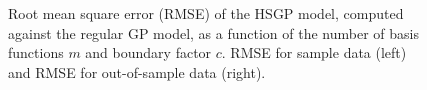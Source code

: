 \documentclass[onecolumn,a4paper,11pt]{article}
\begin{document}
\begin{figure}
\caption{Root mean square error (RMSE) of the HSGP model, computed against the regular GP model, as a function of the number of basis functions $m$ and boundary factor $c$. RMSE for sample data (left) and RMSE for out-of-sample data (right).}
  \label{ch5_fig13_MSE_train_BF_gaydata}
\end{figure}
\end{document}
